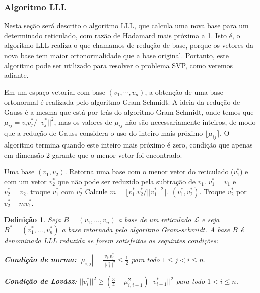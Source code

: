 \documentclass{SBCbookchapter}
\newtheorem{definition}{Definição}{\bfseries}{\itshape}
\begin{document}
\begin{otherlanguage}{brazilian}
\subsubsection{Algoritmo LLL}

Nesta seção será descrito o algoritmo LLL, que calcula uma nova base para um determinado reticulado, com razão de Hadamard mais próxima a 1. Isto é, o algoritmo LLL realiza o que chamamos de redução de base, porque os vetores da nova base tem maior ortonormalidade que a base original. Portanto, este algoritmo pode ser utilizado para resolver o problema SVP, como veremos adiante. 

Em um espaço vetorial com base $(v_1, \cdots, v_n)$, a obtenção de uma base ortonormal é realizada pelo algoritmo Gram-Schmidt. A ideia da redução de Gauss é a mesma que está por trás do algoritmo Gram-Schmidt, onde temos que $\mu_{ij} = v_iv_j^*/||v_j^*||^2$, mas os valores de $\mu_{ij}$ não são necessariamente inteiros, de modo que a redução de Gauss considera o uso do inteiro mais próximo $\lfloor \mu_{ij} \rceil$. O algoritmo termina quando este inteiro mais próximo é zero, condição que apenas em dimensão 2 garante que o menor vetor foi encontrado. 

\begin{algorithm}
\caption{Redução de Gauss}
\label{gauss}
\begin{algorithmic}
\Require Uma base $(v_1,v_2)$.
\Ensure Retorna uma base com o menor vetor do reticulado ($v^*_1$) e com um vetor $v^*_2$ que não pode ser reduzido pela subtração de $v_1$.
\State $v_1^* = v_1$ e $v_2^* = v_2$.
\State troque $v_1^*$ com $v_2^*$
\EndIf
\State Calcule $m = \lfloor v_1^*.v_2^*/||v^*_1||^2 \rceil$.
\Return $(v^*_1,v_2^*)$.
\EndIf
\State Troque $v_2^*$ por $v_2^* - mv^*_1$.
\EndWhile

\end{algorithmic}
\end{algorithm}

\begin{definition}
Seja $B = (v_1, ..., v_n)$ a base de um reticulado $\mathcal{L}$ e seja $B^* = (v_1^*, ..., v_n^*)$ a base retornada pelo algoritmo Gram-schmidt. A base $B$ é denominada \textit{LLL reduzida} se forem satisfeitas as seguintes condições:

\textbf{Condição de norma:} $|\mu_{i,j}| = \frac{v_i.v_j^*}{||v^*_{j}||^2} \leq \frac{1}{2}$ para todo $1 \leq j < i \leq n$.

\textbf{Condição de Lovász:} $||v_i^*||^2 \geq (\frac{3}{4} - \mu_{i,i-1}^2) ||v_{i-1}^*||^2$ para todo $1 < i \leq n$.
\end{definition}


\end{otherlanguage}
\end{document}
